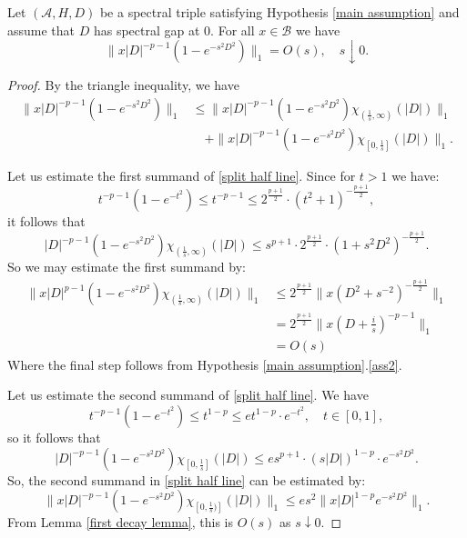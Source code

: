     \begin{lem}\label{left convergence estimate} 
        Let $(\mathcal{A},H,D)$ be a spectral triple satisfying Hypothesis \ref{main assumption} and assume that $D$ has spectral gap at $0.$ For all $x\in\mathcal{B}$ we have
        \begin{equation*}
            \|x|D|^{-p-1}(1-e^{-s^2D^2})\|_1 = O(s),\quad s\downarrow0.
        \end{equation*}
    \end{lem}
    \begin{proof}
        By the triangle inequality, we have
        \begin{align}
            \|x|D|^{-p-1}(1-e^{-s^2D^2})\|_1 &\leq \|x|D|^{-p-1}(1-e^{-s^2D^2})\chi_{(\frac1s,\infty)}(|D|)\|_1\nonumber\\
                                             &\quad +\|x|D|^{-p-1}(1-e^{-s^2D^2})\chi_{[0,\frac1s]}(|D|)\|_1\label{split half line}.
        \end{align}

        Let us estimate the first summand of \eqref{split half line}. Since for $t > 1$ we have:
        $$t^{-p-1}(1-e^{-t^2})\leq t^{-p-1}\leq 2^{\frac{p+1}{2}}\cdot (t^2+1)^{-\frac{p+1}{2}},$$
        it follows that
        \begin{equation*}
            |D|^{-p-1}(1-e^{-s^2D^2})\chi_{(\frac1s,\infty)}(|D|) \leq s^{p+1}\cdot 2^{\frac{p+1}{2}}\cdot (1+s^2D^2)^{-\frac{p+1}{2}}.
        \end{equation*}
        So we may estimate the first summand by:
        \begin{align*}
            \|x|D|^{p-1}(1-e^{-s^2D^2})\chi_{(\frac{1}{s},\infty)}(|D|)\|_1 &\leq 2^{\frac{p+1}{2}}\Big\|x(D^2+s^{-2})^{-\frac{p+1}{2}}\Big\|_1 \\
                                                                            &= 2^{\frac{p+1}{2}}\Big\|x(D+\frac{i}{s})^{-p-1}\Big\|_1\\
                                                                            &= O(s)
        \end{align*}
        Where the final step follows from Hypothesis \ref{main assumption}.\eqref{ass2}.

        Let us estimate the second summand of \eqref{split half line}. We have
        $$t^{-p-1}(1-e^{-t^2})\leq t^{1-p}\leq et^{1-p}\cdot e^{-t^2},\quad t\in[0,1],$$
        so it follows that
        \begin{equation*}
            |D|^{-p-1}(1-e^{-s^2D^2})\chi_{[0,\frac1s]}(|D|) \leq es^{p+1}\cdot (s|D|)^{1-p}\cdot e^{-s^2D^2}.
        \end{equation*}
        So, the second summand in \eqref{split half line} can be estimated by:
        \begin{equation*}
            \|x|D|^{-p-1}(1-e^{-s^2D^2})\chi_{[0,\frac{1}{s})]}(|D|)\|_1 \leq es^2\Big\|x|D|^{1-p}e^{-s^2D^2}\Big\|_1.
        \end{equation*}
        From Lemma \ref{first decay lemma}, this is $O(s)$ as $s\downarrow 0$.
    \end{proof}

